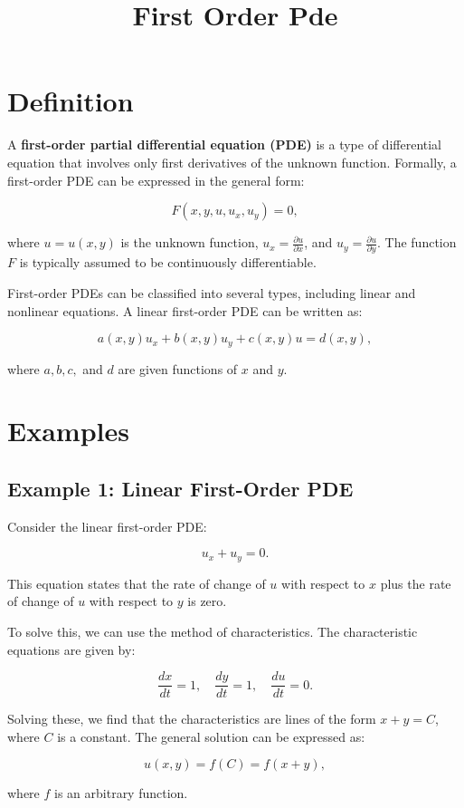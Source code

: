 \documentclass[11pt,a4paper]{article}
\title{First Order Pde}
\date{}
\begin{document}
\maketitle
\section{Definition}
A \textbf{first-order partial differential equation (PDE)} is a type of differential equation that involves only first derivatives of the unknown function. Formally, a first-order PDE can be expressed in the general form:

$$
F(x, y, u, u_x, u_y) = 0,
$$

where \( u = u(x, y) \) is the unknown function, \( u_x = \frac{\partial u}{\partial x} \), and \( u_y = \frac{\partial u}{\partial y} \). The function \( F \) is typically assumed to be continuously differentiable.

First-order PDEs can be classified into several types, including linear and nonlinear equations. A linear first-order PDE can be written as:

$$
a(x, y) u_x + b(x, y) u_y + c(x, y) u = d(x, y),
$$

where \( a, b, c, \) and \( d \) are given functions of \( x \) and \( y \).

\section{Examples}
\subsection{Example 1: Linear First-Order PDE}
Consider the linear first-order PDE:

$$
u_x + u_y = 0.
$$

This equation states that the rate of change of \( u \) with respect to \( x \) plus the rate of change of \( u \) with respect to \( y \) is zero. 

To solve this, we can use the method of characteristics. The characteristic equations are given by:

$$
\frac{dx}{dt} = 1, \quad \frac{dy}{dt} = 1, \quad \frac{du}{dt} = 0.
$$

Solving these, we find that the characteristics are lines of the form \( x + y = C \), where \( C \) is a constant. The general solution can be expressed as:

$$
u(x, y) = f(C) = f(x + y),
$$

where \( f \) is an arbitrary function.
\end{document}
